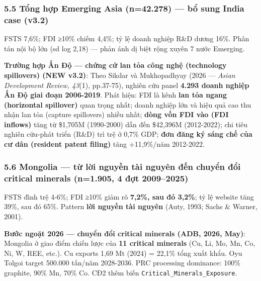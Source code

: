 \documentclass[12pt,a4paper]{article}
\begin{document}
\hypertarget{55-tux1ed5ng-hux1ee3p-emerging-asia-n42278--bux1ed5-sung-india-case-v32}{%
\subsubsection{5.5 Tổng hợp Emerging Asia (n=42.278) --- bổ sung India
case
(v3.2)}\label{55-tux1ed5ng-hux1ee3p-emerging-asia-n42278--bux1ed5-sung-india-case-v32}}

FSTS 7,6\%; FDI ≥10\% chiếm 4,4\%; tỷ lệ doanh nghiệp R\&D dương 16\%.
Phân tán nội bộ lớn (sd log 2,18) --- phản ánh dị biệt rộng xuyên 7 nước
Emerging.

\textbf{Trường hợp Ấn Độ --- chứng cứ lan tỏa công nghệ (technology
spillovers) (NEW v3.2)}: Theo Sikdar và Mukhopadhyay (2026 ---
\emph{Asian Development Review, 43}(1), pp.37-75), nghiên cứu panel
\textbf{4.293 doanh nghiệp Ấn Độ giai đoạn 2006-2019}. Phát hiện: FDI là
kênh \textbf{lan tỏa ngang (horizontal spillover)} quan trọng nhất;
doanh nghiệp lớn và hiệu quả cao thu nhận lan tỏa (capture spillovers)
nhiều nhất; \textbf{dòng vốn FDI vào (FDI inflows)} tăng từ \$1,705M
(1990-2000) dẫn đến \$42,396M (2012-2022); chi tiêu nghiên cứu-phát
triển (R\&D) trì trệ ở 0,7\% GDP; \textbf{đơn đăng ký sáng chế của cư
dân (resident patent filing)} tăng +11,9\%/năm 2012-2022.

\hypertarget{56-mongolia--tux1eeb-lux1eddi-nguyux1ec1n-tuxe0i-nguyuxean-ux111ux1ebfn-chuyux1ec3n-ux111ux1ed5i-critical-minerals-n1905-4-ux111ux1ee3t-20092025}{%
\subsubsection{5.6 Mongolia --- từ lời nguyền tài nguyên đến chuyển đổi
critical minerals (n=1.905, 4 đợt
2009--2025)}\label{56-mongolia--tux1eeb-lux1eddi-nguyux1ec1n-tuxe0i-nguyuxean-ux111ux1ebfn-chuyux1ec3n-ux111ux1ed5i-critical-minerals-n1905-4-ux111ux1ee3t-20092025}}

FSTS đình trệ 4-6\%; FDI ≥10\% giảm rõ \textbf{7,2\%, sau đó 3,2\%}; tỷ
lệ website tăng 39\%, sau đó 65\%. Pattern \textbf{lời nguyền tài
nguyên} (Auty, 1993; Sachs \& Warner, 2001).

\textbf{Bước ngoặt 2026 --- chuyển đổi critical minerals (ADB, 2026,
May)}: Mongolia ở giao điểm chiến lược của \textbf{11 critical minerals}
(Cu, Li, Mo, Mn, Co, Ni, W, REE, etc.). Cu exports 1,69 Mt (2024) =
22,1\% tổng xuất khẩu. Oyu Tolgoi target 500.000 tấn/năm 2028-2036. PRC
processing dominance: 100\% graphite, 90\% Mn, 70\% Co. CĐ2 thêm biến
\texttt{Critical\_Minerals\_Exposure}.
\end{document}
